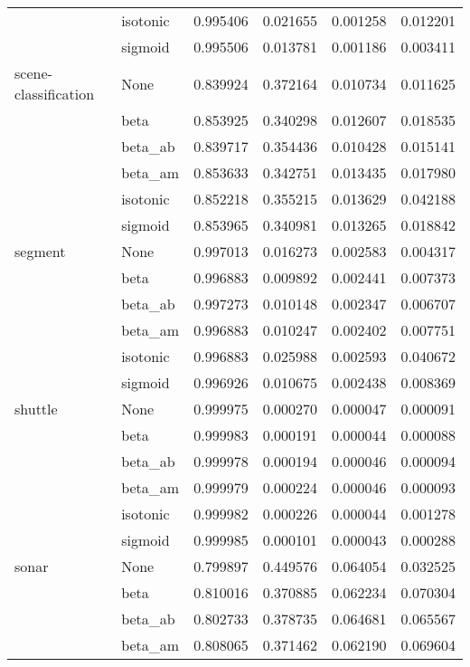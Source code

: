 \begin{tabular}{llrrrr}
        & isotonic &  0.995406 &  0.021655 &  0.001258 &  0.012201 \\
        & sigmoid &  0.995506 &  0.013781 &  0.001186 &  0.003411 \\
scene-classification & None &  0.839924 &  0.372164 &  0.010734 &  0.011625 \\
        & beta &  0.853925 &  0.340298 &  0.012607 &  0.018535 \\
        & beta\_ab &  0.839717 &  0.354436 &  0.010428 &  0.015141 \\
        & beta\_am &  0.853633 &  0.342751 &  0.013435 &  0.017980 \\
        & isotonic &  0.852218 &  0.355215 &  0.013629 &  0.042188 \\
        & sigmoid &  0.853965 &  0.340981 &  0.013265 &  0.018842 \\
segment & None &  0.997013 &  0.016273 &  0.002583 &  0.004317 \\
        & beta &  0.996883 &  0.009892 &  0.002441 &  0.007373 \\
        & beta\_ab &  0.997273 &  0.010148 &  0.002347 &  0.006707 \\
        & beta\_am &  0.996883 &  0.010247 &  0.002402 &  0.007751 \\
        & isotonic &  0.996883 &  0.025988 &  0.002593 &  0.040672 \\
        & sigmoid &  0.996926 &  0.010675 &  0.002438 &  0.008369 \\
shuttle & None &  0.999975 &  0.000270 &  0.000047 &  0.000091 \\
        & beta &  0.999983 &  0.000191 &  0.000044 &  0.000088 \\
        & beta\_ab &  0.999978 &  0.000194 &  0.000046 &  0.000094 \\
        & beta\_am &  0.999979 &  0.000224 &  0.000046 &  0.000093 \\
        & isotonic &  0.999982 &  0.000226 &  0.000044 &  0.001278 \\
        & sigmoid &  0.999985 &  0.000101 &  0.000043 &  0.000288 \\
sonar & None &  0.799897 &  0.449576 &  0.064054 &  0.032525 \\
        & beta &  0.810016 &  0.370885 &  0.062234 &  0.070304 \\
        & beta\_ab &  0.802733 &  0.378735 &  0.064681 &  0.065567 \\
        & beta\_am &  0.808065 &  0.371462 &  0.062190 &  0.069604 \\

\end{tabular}
